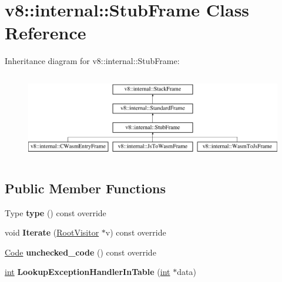 \hypertarget{classv8_1_1internal_1_1StubFrame}{}\section{v8\+:\+:internal\+:\+:Stub\+Frame Class Reference}
\label{classv8_1_1internal_1_1StubFrame}
Inheritance diagram for v8\+:\+:internal\+:\+:Stub\+Frame\+:\begin{figure}[H]
\begin{center}
\leavevmode
\includegraphics[height=3.809524cm]{classv8_1_1internal_1_1StubFrame}
\end{center}
\end{figure}
\subsection*{Public Member Functions}
\begin{DoxyCompactItemize}
\item 
\mbox{\label{classv8_1_1internal_1_1StubFrame_acbc62ddbc3500de853289f33cfbf1f7a}} 
Type {\bfseries type} () const override
\item 
\mbox{\label{classv8_1_1internal_1_1StubFrame_aaf1d5f5bf1c732afac7c85335a648da7}} 
void {\bfseries Iterate} (\mbox{\hyperlink{classv8_1_1internal_1_1RootVisitor}{Root\+Visitor}} $\ast$v) const override
\item 
\mbox{\label{classv8_1_1internal_1_1StubFrame_a3877210fa0967109c5a7f2fc4b80c089}} 
\mbox{\hyperlink{classv8_1_1internal_1_1Code}{Code}} {\bfseries unchecked\+\_\+code} () const override
\item 
\mbox{\label{classv8_1_1internal_1_1StubFrame_abd96646e429095fe7796ba1597b70492}} 
\mbox{\hyperlink{classint}{int}} {\bfseries Lookup\+Exception\+Handler\+In\+Table} (\mbox{\hyperlink{classint}{int}} $\ast$data)
\end{DoxyCompactItemize}
